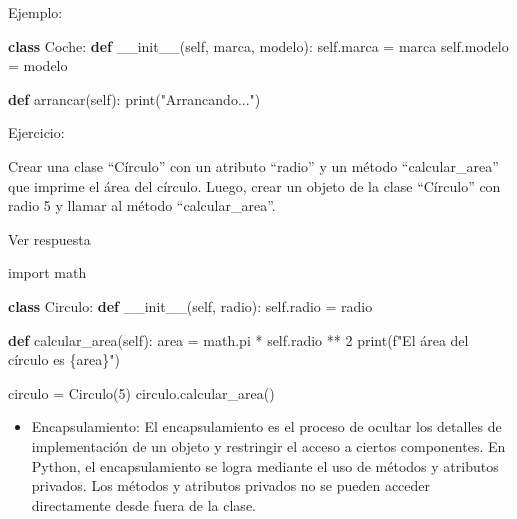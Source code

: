 \documentclass[
  a4paper,
  DIV=11,
  numbers=noendperiod,
  onepage,
  openany]{scrreprt}
\newenvironment{Shaded}{\begin{snugshade}}{\end{snugshade}}
\newcommand{\BuiltInTok}[1]{\textcolor[rgb]{0.00,0.23,0.31}{#1}}
\newcommand{\DecValTok}[1]{\textcolor[rgb]{0.68,0.00,0.00}{#1}}
\newcommand{\FunctionTok}[1]{\textcolor[rgb]{0.28,0.35,0.67}{#1}}
\newcommand{\ImportTok}[1]{\textcolor[rgb]{0.00,0.46,0.62}{#1}}
\newcommand{\KeywordTok}[1]{\textcolor[rgb]{0.00,0.23,0.31}{\textbf{#1}}}
\newcommand{\NormalTok}[1]{\textcolor[rgb]{0.00,0.23,0.31}{#1}}
\newcommand{\OperatorTok}[1]{\textcolor[rgb]{0.37,0.37,0.37}{#1}}
\newcommand{\SpecialCharTok}[1]{\textcolor[rgb]{0.37,0.37,0.37}{#1}}
\newcommand{\SpecialStringTok}[1]{\textcolor[rgb]{0.13,0.47,0.30}{#1}}
\newcommand{\StringTok}[1]{\textcolor[rgb]{0.13,0.47,0.30}{#1}}
\newcommand{\VariableTok}[1]{\textcolor[rgb]{0.07,0.07,0.07}{#1}}
\providecommand{\tightlist}{%
  \setlength{\itemsep}{0pt}\setlength{\parskip}{0pt}}\usepackage{longtable,booktabs,array}
\begin{document}
\begin{tcolorbox}
Ejemplo:

\begin{Shaded}
\begin{Highlighting}[]
\KeywordTok{class}\NormalTok{ Coche:}
    \KeywordTok{def} \FunctionTok{\_\_init\_\_}\NormalTok{(}\VariableTok{self}\NormalTok{, marca, modelo):}
        \VariableTok{self}\NormalTok{.marca }\OperatorTok{=}\NormalTok{ marca}
        \VariableTok{self}\NormalTok{.modelo }\OperatorTok{=}\NormalTok{ modelo}

    \KeywordTok{def}\NormalTok{ arrancar(}\VariableTok{self}\NormalTok{):}
        \BuiltInTok{print}\NormalTok{(}\StringTok{"Arrancando..."}\NormalTok{)}
\end{Highlighting}
\end{Shaded}

Ejercicio:

Crear una clase ``Círculo'' con un atributo ``radio'' y un método
``calcular\_area'' que imprime el área del círculo. Luego, crear un
objeto de la clase ``Círculo'' con radio 5 y llamar al método
``calcular\_area''.

Ver respuesta

\begin{Shaded}
\begin{Highlighting}[]
\ImportTok{import}\NormalTok{ math}

\KeywordTok{class}\NormalTok{ Circulo:}
    \KeywordTok{def} \FunctionTok{\_\_init\_\_}\NormalTok{(}\VariableTok{self}\NormalTok{, radio):}
        \VariableTok{self}\NormalTok{.radio }\OperatorTok{=}\NormalTok{ radio}

    \KeywordTok{def}\NormalTok{ calcular\_area(}\VariableTok{self}\NormalTok{):}
\NormalTok{        area }\OperatorTok{=}\NormalTok{ math.pi }\OperatorTok{*} \VariableTok{self}\NormalTok{.radio }\OperatorTok{**} \DecValTok{2}
        \BuiltInTok{print}\NormalTok{(}\SpecialStringTok{f"El área del círculo es }\SpecialCharTok{\{}\NormalTok{area}\SpecialCharTok{\}}\SpecialStringTok{"}\NormalTok{)}

\NormalTok{circulo }\OperatorTok{=}\NormalTok{ Circulo(}\DecValTok{5}\NormalTok{)}
\NormalTok{circulo.calcular\_area()}
\end{Highlighting}
\end{Shaded}

\begin{itemize}
\tightlist
\item
  Encapsulamiento: El encapsulamiento es el proceso de ocultar los
  detalles de implementación de un objeto y restringir el acceso a
  ciertos componentes. En Python, el encapsulamiento se logra mediante
  el uso de métodos y atributos privados. Los métodos y atributos
  privados no se pueden acceder directamente desde fuera de la clase.
\end{itemize}


\end{tcolorbox}
\end{document}
